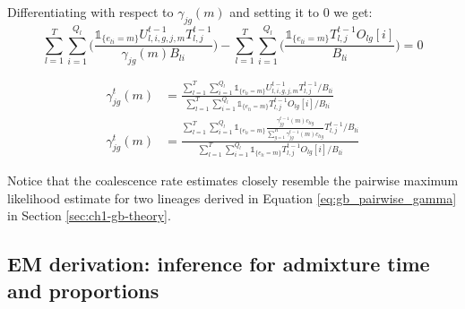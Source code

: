 Differentiating with respect to $\gamma_{jg}(m)$ and setting it to 0 we get:
\begin{equation}
\sum_{l = 1}^T \sum_{i = 1}^{Q_l}  \Big( \frac{\mathds{1}_{\{e_{l i} = m\}}U_{l,i,g,j,m}^{t-1} T_{l,j}^{t-1}}{\gamma_{jg}(m)B_{li}} \Big) -  \sum_{l = 1}^T \sum_{i = 1}^{Q_l} \Big(\frac{\mathds{1}_{\{e_{l i} = m\}} T_{l,j}^{t-1}  O_{lg}[i]}{B_{li}} \Big) = 0
\end{equation} 

\begin{align}
    \gamma_{jg}^{t}(m) &= \frac{\sum_{l = 1}^T \sum_{i = 1}^{Q_l}  \mathds{1}_{\{e_{l i} = m\}} U_{l,i,g,j,m}^{t-1} T_{l,j}^{t-1}/B_{li}}{\sum_{l = 1}^T \sum_{i = 1}^{Q_l}  \mathds{1}_{\{e_{l i} = m\}} T_{l,j}^{t-1}  O_{lg}[i]/B_{li} } \nonumber \\
    \gamma_{jg}^{t}(m) &= \frac{\sum_{l = 1}^T \sum_{i = 1}^{Q_l}  \mathds{1}_{\{e_{l i} = m\}} \frac{\gamma_{jg}^{t-1}(m)c_{lig}}{\sum_{g=1}^R \gamma_{jg}^{t-1}(m)c_{lig}} T_{l,j}^{t-1}/B_{li}}{\sum_{l = 1}^T \sum_{i = 1}^{Q_l}  \mathds{1}_{\{e_{l i} = m\}} T_{l,j}^{t-1}  O_{lg}[i]/B_{li} }
\label{eq:gamma_update}
\end{align}

Notice that the coalescence rate estimates closely resemble the pairwise maximum likelihood estimate for two lineages derived in Equation \ref{eq:gb_pairwise_gamma} in Section \ref{sec:ch1-gb-theory}.


\subsection{EM derivation: inference for admixture time and proportions}
\label{sec:gb_em_props}

